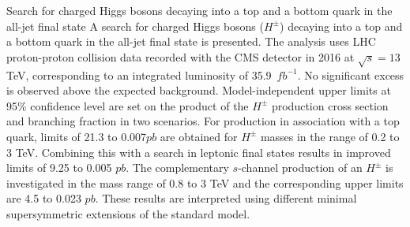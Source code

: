 \begin{MyArticle}[enhanced, tikz={rotate=0}]{Search for charged Higgs bosons decaying into a top and a bottom quark in the all-jet final state}
    A search for charged Higgs bosons ($H^{\pm}$) decaying into a top
    and a bottom quark in the all-jet final state is presented. The
    analysis uses LHC proton-proton collision data recorded with the
    CMS detector in 2016 at $\sqrt{s} = 13$ TeV, corresponding to an
    integrated luminosity of 35.9~$fb^{-1}$. No significant excess is
    observed above the expected background. Model-independent upper
    limits at 95$\%$ confidence level are set on the product of the
    $H^{\pm}$ production cross section and branching fraction in two
    scenarios.  For production in association with a top quark,
    limits of 21.3 to 0.007$pb$ are obtained for $H^{\pm}$ masses in the
    range of 0.2 to 3 TeV. Combining this with a search in leptonic
    final states results in improved limits of 9.25 to 0.005 $pb$. The
    complementary $s$-channel production of an $H^{\pm}$ is
    investigated in the mass range of 0.8 to 3 TeV and the
    corresponding upper limits are 4.5 to 0.023 $pb$. These results are
    interpreted using different minimal supersymmetric extensions of
    the standard model.
\end{MyArticle}

